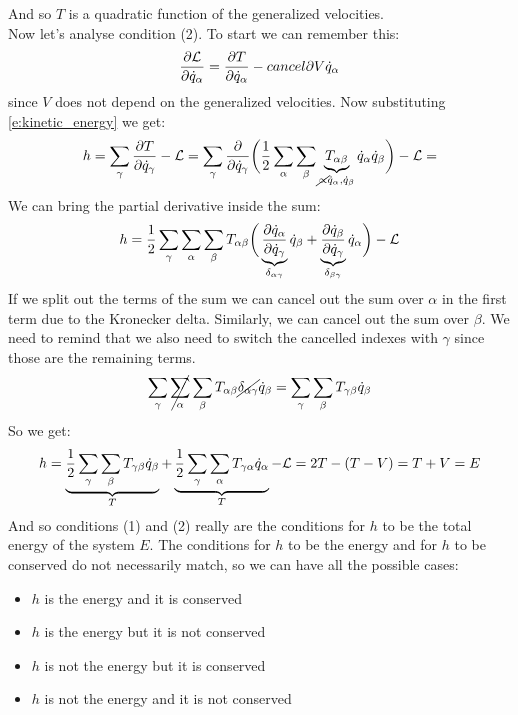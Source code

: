 And so $T$ is a quadratic function of the generalized velocities.\\
Now let's analyse condition (2). To start we can remember this:
\begin{equation}
    \pdv{\lagr}{\dot{q}_{\alpha}} = \dfrac{\partial T}{\partial \dot{q}_{\alpha}} - \\cancel{\partial{V}{\dot{q}_{\alpha}}}
\end{equation}
since $V$ does not depend on the generalized velocities. Now substituting \eqref{e:kinetic_energy} we get:
\begin{equation}
    h = \displaystyle\sum_{\gamma}\dfrac{\partial T}{\partial \dot{q}_{\gamma}} - \mathcal{L} = \displaystyle\sum_{\gamma}\dfrac{\partial}{\partial \dot{q}_{\gamma}}\bigg(\dfrac{1}{2}\displaystyle\sum_{\alpha}\displaystyle\sum_{\beta}\underbrace{T_{\alpha \beta}}_{\cancel{\propto} \dot{q}_{\alpha}, \dot{q}_{\beta}}\dot{q}_{\alpha}\dot{q}_{\beta}\bigg)  - \mathcal{L} =
\end{equation}
We can bring the partial derivative inside the sum:
\begin{equation}
    h = \dfrac{1}{2}\displaystyle\sum_{\gamma}\displaystyle\sum_{\alpha}\displaystyle\sum_{\beta}T_{\alpha \beta}\bigg(\underbrace{\dfrac{\partial \dot{q}_{\alpha}}{\partial \dot{q}_{\gamma}}}_{\delta_{\alpha \gamma}}\dot{q}_{\beta} + \underbrace{\dfrac{\partial \dot{q}_{\beta}}{\partial \dot{q}_{\gamma}}}_{\delta_{\beta \gamma}}\dot{q}_{\alpha}\bigg) - \mathcal{L}
\end{equation}
If we split out the terms of the sum we can cancel out the sum over $\alpha$ in the first term due to the Kronecker delta. Similarly, we can cancel out the sum over $\beta$. We need to remind that we also need to switch the cancelled indexes with $\gamma$ since those are the remaining terms.
\begin{equation}
    \displaystyle\sum_{\gamma}\cancel{\displaystyle\sum_{\alpha}}\displaystyle\sum_{\beta}T_{\alpha \beta }\cancel{\delta_{\alpha \gamma}}\dot{q}_{\beta} = \displaystyle\sum_{\gamma}\displaystyle\sum_{\beta}T_{\gamma \beta }\dot{q}_{\beta}
\end{equation}
So we get:
\begin{equation}
    h = \underbrace{\dfrac{1}{2}\displaystyle\sum_{\gamma}\displaystyle\sum_{\beta}T_{\gamma \beta }\dot{q}_{\beta}}_{T} + \underbrace{\dfrac{1}{2}\displaystyle\sum_{\gamma}\displaystyle\sum_{\alpha}T_{\gamma \alpha }\dot{q}_{\alpha}}_{T} - \mathcal{L} = 2T - (T-V) = T + V = E
\end{equation}
And so conditions (1) and (2) really are the conditions for $h$ to be the total energy of the system $E$. The conditions for $h$ to be the energy and for $h$ to be conserved do not necessarily match, so we can have all the possible cases:
\begin{itemize}
    \item $h$ is the energy and it is conserved
    \item $h$ is the energy but it is not conserved
    \item $h$ is not the energy but it is conserved
    \item $h$ is not the energy and it is not conserved
\end{itemize}

